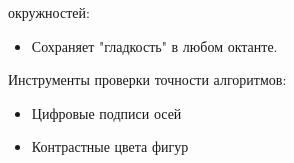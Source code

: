 \documentclass[a4paper, 12pt]{article}
\begin{document}
 окружностей:
\begin{itemize}
-стороннюю симметрию.
\item Сохраняет "гладкость" в любом октанте.
\end{itemize}

\noindent Инструменты проверки точности алгоритмов:
 \begin{itemize}
      сетка с шагом 50пикселей
     \item Цифровые подписи осей
     \item Контрастные цвета фигур 
 \end{itemize}
\end{document}
